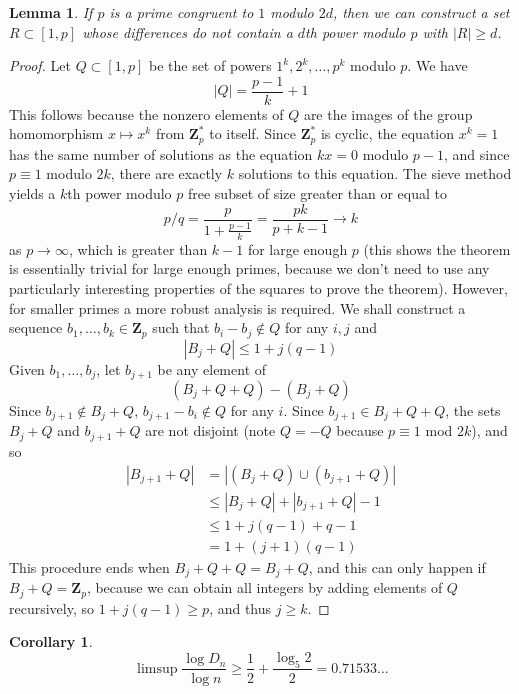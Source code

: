 \documentclass{article}
\theoremstyle{plain}
\newtheorem{lemma}{Lemma}
\newtheorem*{corollary}{Corollary}
\theoremstyle{plain}
\begin{document}
\begin{lemma}
    If $p$ is a prime congruent to $1$ modulo $2d$, then we can construct a set $R \subset [1,p]$ whose differences do not contain a $d$th power modulo $p$ with $|R| \geq d$.
\end{lemma}
\begin{proof}
    Let $Q \subset [1,p]$ be the set of powers $1^k, 2^k, \dots, p^k$ modulo $p$. We have
    \[ |Q| = \frac{p-1}{k} + 1 \]
    This follows because the nonzero elements of $Q$ are the images of the group homomorphism $x \mapsto x^k$ from $\mathbf{Z}_p^*$ to itself. Since $\mathbf{Z}_p^*$ is cyclic, the equation $x^k = 1$ has the same number of solutions as the equation $kx = 0$ modulo $p-1$, and since $p \equiv 1$ modulo $2k$, there are exactly $k$ solutions to this equation. The sieve method yields a $k$th power modulo $p$ free subset of size greater than or equal to
    \[ p/q = \frac{p}{1 + \frac{p-1}{k}} = \frac{pk}{p + k - 1} \to k \]
    as $p \to \infty$, which is greater than $k-1$ for large enough $p$ (this shows the theorem is essentially trivial for large enough primes, because we don't need to use any particularly interesting properties of the squares to prove the theorem). However, for smaller primes a more robust analysis is required. We shall construct a sequence $b_1, \dots, b_k \in \mathbf{Z}_p$ such that $b_i - b_j \not \in Q$ for any $i,j$ and
    \[ |B_j + Q| \leq 1 + j(q-1) \]
    Given $b_1, \dots, b_j$, let $b_{j+1}$ be any element of
    \[ (B_j + Q + Q) - (B_j + Q) \]
    Since $b_{j+1} \not \in B_j + Q$, $b_{j+1} - b_i \not \in Q$ for any $i$. Since $b_{j+1} \in B_j + Q + Q$, the sets $B_j + Q$ and $b_{j+1} + Q$ are not disjoint (note $Q = -Q$ because $p \equiv 1$ mod $2k$), and so
    \begin{align*}
        |B_{j+1} + Q| &= |(B_j + Q) \cup (b_{j+1} + Q)|\\
        &\leq |B_j + Q| + |b_{j+1} + Q| - 1\\
        &\leq 1 + j(q-1) + q - 1\\
        &= 1 + (j+1)(q-1)
    \end{align*}
    This procedure ends when $B_j + Q + Q = B_j + Q$, and this can only happen if $B_j + Q = \mathbf{Z}_p$, because we can obtain all integers by adding elements of $Q$ recursively, so $1 + j(q-1) \geq p$, and thus $j \geq k$.
\end{proof}

\begin{corollary}
    \[ \limsup \frac{\log D_n}{\log n} \geq \frac{1}{2} + \frac{\log_5 2}{2} = 0.71533\dots \]
\end{corollary}
\end{document}
